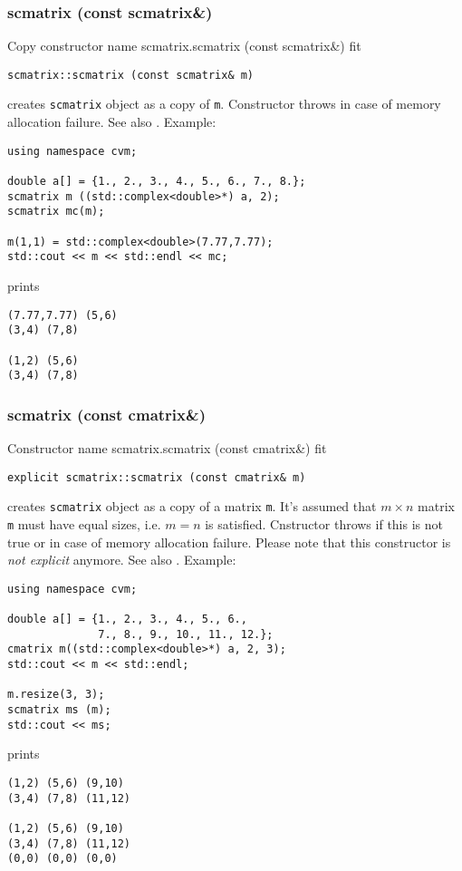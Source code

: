 \subsubsection{scmatrix (const scmatrix\&)}
Copy constructor%
\pdfdest name {scmatrix.scmatrix (const scmatrix&)} fit
\begin{verbatim}
scmatrix::scmatrix (const scmatrix& m)
\end{verbatim}
creates  \verb"scmatrix" object as a copy of \verb"m".
Constructor throws  
in case of memory allocation failure.
See also .
Example:
\begin{Verbatim}
using namespace cvm;

double a[] = {1., 2., 3., 4., 5., 6., 7., 8.};
scmatrix m ((std::complex<double>*) a, 2);
scmatrix mc(m);

m(1,1) = std::complex<double>(7.77,7.77);
std::cout << m << std::endl << mc;
\end{Verbatim}
prints
\begin{Verbatim}
(7.77,7.77) (5,6)
(3,4) (7,8)

(1,2) (5,6)
(3,4) (7,8)
\end{Verbatim}
\newpage





\subsubsection{scmatrix (const cmatrix\&)}
Constructor%
\pdfdest name {scmatrix.scmatrix (const cmatrix&)} fit
\begin{verbatim}
explicit scmatrix::scmatrix (const cmatrix& m)
\end{verbatim}
creates  \verb"scmatrix" object as a copy of a matrix \verb"m".
It's assumed that $m\times n$ matrix \verb"m" must have equal
sizes, i.e. $m = n$ is satisfied.
Cnstructor throws  
if this is not true or in case of memory allocation failure.
Please note that this constructor is \emph{not explicit} anymore.
See also .
Example:
\begin{Verbatim}
using namespace cvm;

double a[] = {1., 2., 3., 4., 5., 6.,
              7., 8., 9., 10., 11., 12.};
cmatrix m((std::complex<double>*) a, 2, 3);
std::cout << m << std::endl;

m.resize(3, 3);
scmatrix ms (m);
std::cout << ms;
\end{Verbatim}
prints
\begin{Verbatim}
(1,2) (5,6) (9,10)
(3,4) (7,8) (11,12)

(1,2) (5,6) (9,10)
(3,4) (7,8) (11,12)
(0,0) (0,0) (0,0)
\end{Verbatim}
\newpage




